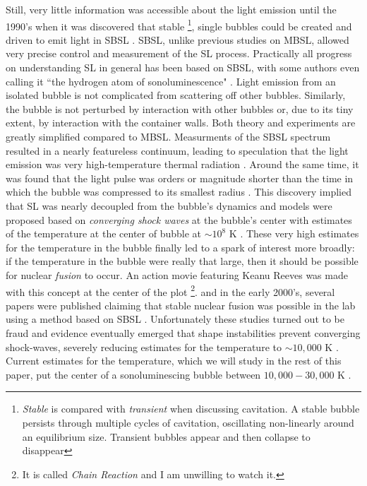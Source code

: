 \documentclass[11pt,prb,aps,nofootinbib,superscriptaddress,floatfix]{revtex4-2}
\begin{document}
Still, very little information was accessible about the light emission until the 1990's when it was discovered that stable \footnote{\emph{Stable} is compared with \emph{transient} when discussing cavitation. A stable bubble persists through multiple cycles of cavitation, oscillating non-linearly around an equilibrium size. Transient bubbles appear and then collapse to disappear}, single bubbles could be created and driven to emit light in SBSL \cite{gaitan1990experimental,gaitan1992sonoluminescence,crum1994sonoluminescence}. SBSL, unlike previous studies on MBSL, allowed very precise control and measurement of the SL process. Practically all progress on understanding SL in general has been based on SBSL, with some authors even calling it ``the hydrogen atom of sonoluminescence" \cite{lohse2018bubble,crum1994sonoluminescence}. Light emission from an isolated bubble is not complicated from scattering off other bubbles. Similarly, the bubble is not perturbed by interaction with other bubbles or, due to its tiny extent, by interaction with the container walls. Both theory and experiments are greatly simplified compared to MBSL. Measurments of the SBSL spectrum resulted in a nearly featureless continuum, leading to speculation that the light emission was very high-temperature thermal radiation \cite{hiller1992spectrum,hiller1994effect}. Around the same time, it was found that the light pulse was orders or magnitude shorter than the time in which the bubble was compressed to its smallest radius \cite{barber1992resolving,barber1991observation}. This discovery implied that SL was nearly decoupled from the bubble's dynamics and models were proposed based on \emph{converging shock waves} at the bubble's center with estimates of the temperature at the center of bubble at $\sim10^8$ K \cite{wu1993shock,greenspan1993sonoluminescence}. These very high estimates for the temperature in the bubble finally led to a spark of interest more broadly: if the temperature in the bubble were really that large, then it should be possible for nuclear \emph{fusion} to occur. An action movie featuring Keanu Reeves was made with this concept at the center of the plot \footnote{It is called \emph{Chain Reaction} and I am unwilling to watch it.}. and in the early 2000's, several papers were published claiming that stable nuclear fusion was possible in the lab using a method based on SBSL \cite{}. Unfortunately these studies turned out to be fraud and evidence eventually emerged that shape instabilities prevent converging shock-waves, severely reducing estimates for the temperature to $\sim 10,000$ K \cite{brenner2002single}. Current estimates for the temperature, which we will study in the rest of this paper, put the center of a sonoluminescing bubble between $10,000-30,000$ K \cite{flannigan2005plasma,suslick2008inside,yasui20185acoustic,an2009diagnosing,an2008spectral,an2006mechanism}. 
\end{document}
